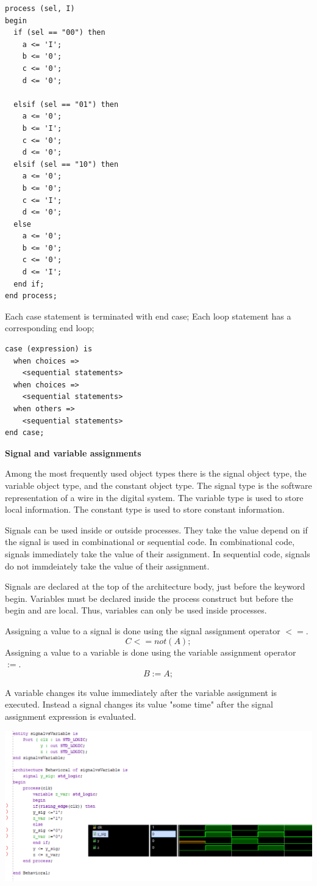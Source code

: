 \begin{verbatim}
process (sel, I)
begin
  if (sel == "00") then
    a <= 'I';
    b <= '0';
    c <= '0';
    d <= '0';
      
  elsif (sel == "01") then
    a <= '0';
    b <= 'I';
    c <= '0';
    d <= '0';
  elsif (sel == "10") then
    a <= '0';
    b <= '0';
    c <= 'I';
    d <= '0';
  else
    a <= '0';
    b <= '0';
    c <= '0';
    d <= 'I';
  end if;
end process;
\end{verbatim}


Each case statement is terminated with end case; Each loop statement has a corresponding end loop;

\begin{verbatim}
case (expression) is
  when choices =>
    <sequential statements>
  when choices =>
    <sequential statements>
  when others =>
    <sequential statements>
end case;
\end{verbatim}


\textbf{Signal and variable assignments}

Among the most frequently used object types there is the signal object type, the variable object type,
and the constant object type. The signal type is the software representation of a wire in the digital system.
The variable type is used to store local information.
The constant type is used to store constant information.

Signals can be used inside or outside processes. They take the value depend on if the signal is used
in combinational or sequential code.
In combinational code, signals immediately take the value of their assignment. In sequential code,
signals do not immdeiately take the value of their assignment.

Signals are declared at the top of the architecture body, just before the keyword begin.
Variables must be declared inside the process construct but before the begin and are local.
Thus, variables can only be used inside processes.

Assigning a value to a signal is done using the signal assignment operator $<=$.
$$C <= not(A);$$
Assigning a value to a variable is done using the variable assignment operator $:=$.
$$ B := A;$$

A variable changes its value immediately after the variable assignment is executed. Instead a signal
changes its value "some time" after the signal assignment expression is evaluated.

\begin{center}
	\includegraphics[width=\textwidth]{images/signal_variable.png}
\end{center}


